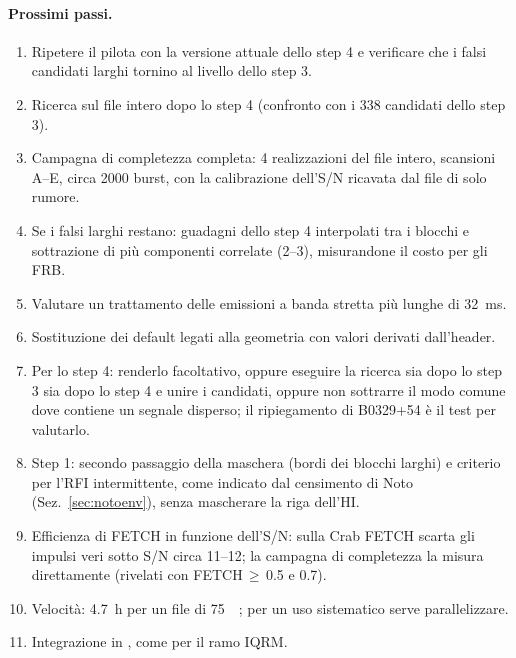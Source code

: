 \paragraph{Prossimi passi.}
\begin{enumerate}
  \item Ripetere il pilota con la versione attuale dello step 4 e verificare che i falsi candidati larghi tornino al
    livello dello step 3.
  \item Ricerca sul file intero dopo lo step 4 (confronto con i 338 candidati dello step 3).
  \item Campagna di completezza completa: 4 realizzazioni del file intero, scansioni A--E, circa 2000 burst, con la
    calibrazione dell'S/N ricavata dal file di solo rumore.
  \item Se i falsi larghi restano: guadagni dello step 4 interpolati tra i blocchi e sottrazione di più componenti correlate
    (2--3), misurandone il costo per gli FRB.
  \item Valutare un trattamento delle emissioni a banda stretta più lunghe di \SI{32}{\milli\second}.
  \item Sostituzione dei default legati alla geometria con valori derivati
    dall'header.
  \item Per lo step 4: renderlo facoltativo, oppure eseguire la ricerca sia dopo lo step 3 sia dopo lo step 4 e unire i
    candidati, oppure non sottrarre il modo comune dove contiene un segnale disperso; il ripiegamento di B0329+54 è il
    test per valutarlo.
  \item Step 1: secondo passaggio della maschera (bordi dei blocchi larghi) e criterio per l'RFI intermittente, come
    indicato dal censimento di Noto (Sez.~\ref{sec:notoenv}), senza mascherare la riga dell'HI.
  \item Efficienza di FETCH in funzione dell'S/N: sulla Crab FETCH scarta gli impulsi veri sotto S/N circa 11--12; la
    campagna di completezza la misura direttamente (rivelati con FETCH\,$\geq$\,0.5 e 0.7).
  \item Velocità: \SI{4.7}{\hour} per un file di \SI{75}{\giga\byte}; per un uso sistematico serve parallelizzare.
  \item Integrazione in , come per il ramo IQRM.
\end{enumerate}
